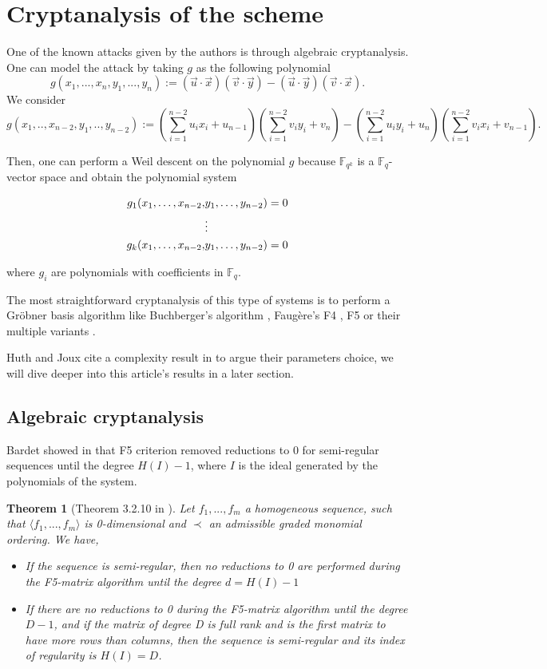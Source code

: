 \documentclass[english]{article}
\newtheorem{theorem}{Theorem}[section]
\begin{document}
		\section{Cryptanalysis of the scheme}
		One of the known attacks given by the authors is through algebraic cryptanalysis.
		One can model the attack by taking $g$ as the following polynomial
		$$
		g(x_1,...,x_n,y_1,...,y_n) := (\vec{u} \cdot \vec{x})(\vec{v} \cdot \vec{y}) - (\vec{u} \cdot \vec{y})(\vec{v} \cdot \vec{x}).
		$$
		We consider
		$$
		g(x_1,..,x_{n-2},y_1,..,y_{n-2}) := (\sum_{i = 1}^{n-2}u_{i}x_{i} + u_{n-1})(\sum_{i = 1}^{n-2}v_{i}y_{i} + v_{n}) - (\sum_{i = 1}^{n-2}u_{i}y_{i} + u_{n})(\sum_{i = 1}^{n-2}v_{i}x_{i} + v_{n-1}).
		$$
		
		Then, one can perform a Weil descent on the polynomial $g$ because $\mathbb{F}_{q^k}$ is a $\mathbb{F}_q$-vector space and obtain the polynomial system
		

		\begin{align}
			g_1(x_1, \dots, x_{n-2},& y_1, \dots, y_{n-2}) = 0 \notag \\
			&\vdots \notag \\
			g_k(x_1, \dots, x_{n-2},& y_1, \dots, y_{n-2}) = 0 \notag
		\end{align}
		
		where $g_i$ are polynomials with coefficients in $\mathbb{F}_q$.
		
		The most straightforward cryptanalysis of this type of systems is to perform a Gröbner basis algorithm like Buchberger's algorithm \cite{Buc}, Faugère's F4 \cite{F99}, F5 \cite{F02} or their multiple variants \cite{EF19}.
		
		Huth and Joux cite a complexity result in \cite{FSS11} to argue their parameters choice, we will dive deeper into this article's results in a later section.

		\subsection{Algebraic cryptanalysis}
		
		Bardet showed in \cite{Bardet04} that F5 criterion removed reductions to 0 for semi-regular sequences until the degree $H(I) - 1$, where $I$ is the ideal generated by the polynomials of the system.
		
		\begin{theorem}[Theorem 3.2.10 in \cite{Bardet04}]
			Let $f_1,...,f_m$ a homogeneous sequence, such that $\langle f_1,...,f_m \rangle$ is 0-dimensional and
			$\prec$ an admissible graded monomial ordering. We have,
			\begin{itemize}
				\item[-] If the sequence is semi-regular, then no reductions to 0 are performed during the F5-matrix algorithm until the degree $d = H(I) - 1$
				\item[-] If there are no reductions to 0 during the F5-matrix algorithm until the degree $D - 1$, and if the matrix of degree D is full rank and is the first matrix to have more rows than columns, then the sequence is semi-regular and its index of regularity is $H(I) = D$.
			\end{itemize}
		\end{theorem}
		
\end{document}
